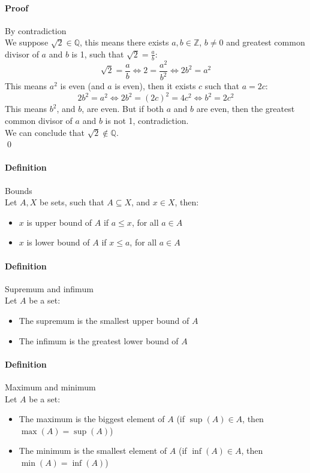 \documentclass{article}
\newcommand{\Z}{\mathbb{Z}}
\newcommand{\Q}{\mathbb{Q}}
\newcommand{\Def}{\paragraph{Definition}}
\newcommand{\Proof}{\paragraph{Proof}}
\begin{document}
	\Proof By contradiction
\\We suppose $\sqrt{2} \in \Q$, this means there exists $a, b \in \Z$, $b \neq
	0$ and greatest common divisor of $a$ and $b$ is 1, such
	that $\sqrt{2} = \frac{a}{b}$:
	\begin{equation*}
		\sqrt{2} = \frac{a}{b} \iff 2 = \frac{a^2}{b^2} \iff 2b^2 = a^2
	\end{equation*}
	This means $a^2$ is even (and $a$ is even), then it exists $c$ such that $a =
	2c$:
	\begin{equation*}
		2b^2 = a^2 \iff 2b^2 = (2c)^2 = 4c^2 \iff b^2 = 2c^2
	\end{equation*}
	This means $b^2$, and $b$, are even. But if both $a$ and $b$ are even, then
	the greatest common divisor of $a$ and $b$ is not 1, contradiction.
\\We can conclude that $\sqrt{2} \notin \Q$.
\\\qed

	\Def Bounds
\\Let $A, X$ be sets, such that $A \subseteq X$, and $x \in X$, then:
	\begin{itemize}
		\item $x$ is upper bound of $A$ if $a \leq x$, for all $a \in A$
		\item $x$ is lower bound of $A$ if $x \leq a$, for all $a \in A$
	\end{itemize}

	\Def Supremum and infimum
\\Let $A$ be a set:
	\begin{itemize}
		\item The supremum is the smallest upper bound of $A$
		\item The infimum is the greatest lower bound of $A$
	\end{itemize}

	\Def Maximum and minimum
\\Let $A$ be a set:
	\begin{itemize}
		\item The maximum is the biggest element of $A$ (if $\sup(A) \in A$, then
		$\max(A) = \sup(A)$)
		\item The minimum is the smallest element of $A$ (if $\inf(A) \in A$, then
		$\min(A) = \inf(A)$)
	\end{itemize}
\end{document}
